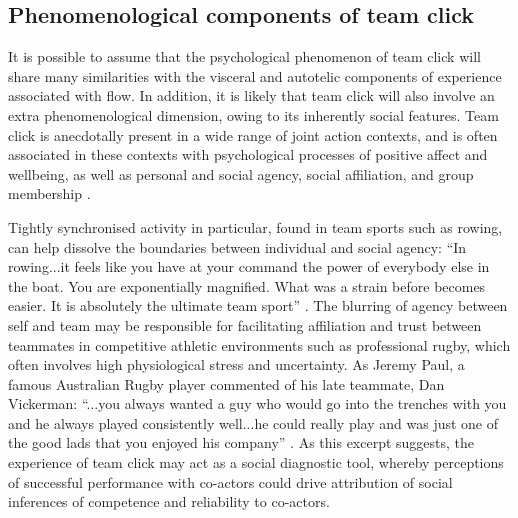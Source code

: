 \begin{CJK}{UTF8}{gbsn}


\subsection{Phenomenological components of team click}
It is possible to assume that the psychological phenomenon of team click will share many similarities with the visceral and autotelic components of experience associated with flow.  In addition, it is likely that team click will also involve an extra phenomenological dimension, owing to its inherently social features.  Team click is anecdotally present in a wide range of joint action contexts, and is often associated in these contexts with psychological processes of positive affect and wellbeing, as well as personal and social agency, social affiliation, and group membership \citep{Jackson1995,Marsh2009,Wheatley2012,Slingerland2014}.

Tightly synchronised activity in particular, found in team sports such as rowing, can help dissolve the boundaries between individual and social agency: ``In rowing...it feels like you have at your command the power of everybody else in the boat. You are exponentially magnified. What was a strain before becomes easier. It is absolutely the ultimate team sport'' \citep[x]{Brown2016}.
The blurring of agency between self and team may be responsible for facilitating affiliation and trust between teammates in competitive athletic environments such as professional rugby, which often involves high physiological stress and uncertainty.  As Jeremy Paul, a famous Australian Rugby player commented of his late teammate, Dan Vickerman: ``...you always wanted a guy who would go into the trenches with you and he always played consistently well...he could really play and was just one of the good lads that you enjoyed his company'' \citep{Fox-Sports2017}.  As this excerpt suggests, the experience of team click may act as a social diagnostic tool, whereby perceptions of successful performance with co-actors could drive attribution of social inferences of competence and reliability to co-actors.


\end{CJK}
